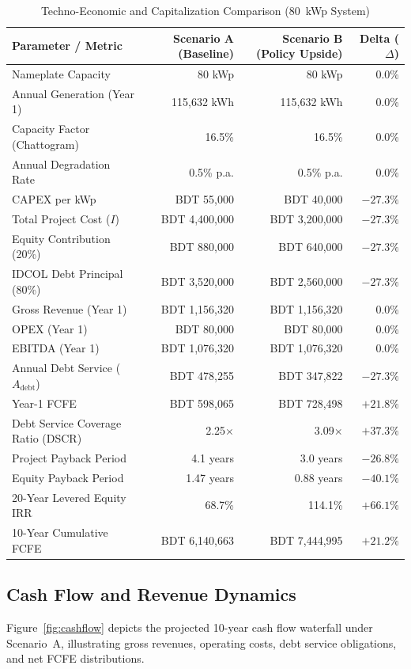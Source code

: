 \documentclass[11pt,a4paper]{article}
\begin{document}
\begin{table}[htbp]
\centering
\footnotesize
\caption{Techno-Economic and Capitalization Comparison (80~kWp System)}
\label{tab:comparison}
\begin{tabular}{@{}l*{3}{r}@{}}
\toprule
\textbf{Parameter / Metric} & \textbf{Scenario A (Baseline)} & \textbf{Scenario B (Policy Upside)} & \textbf{Delta ($\Delta$)} \\
\midrule
Nameplate Capacity & 80 kWp & 80 kWp & 0.0\% \\
Annual Generation (Year 1) & 115,632 kWh & 115,632 kWh & 0.0\% \\
Capacity Factor (Chattogram) & 16.5\% & 16.5\% & 0.0\% \\
Annual Degradation Rate & 0.5\% p.a. & 0.5\% p.a. & 0.0\% \\
\midrule
CAPEX per kWp & BDT 55,000 & BDT 40,000 & $-27.3\%$ \\
Total Project Cost ($I$) & BDT 4,400,000 & BDT 3,200,000 & $-27.3\%$ \\
Equity Contribution (20\%) & BDT 880,000 & BDT 640,000 & $-27.3\%$ \\
IDCOL Debt Principal (80\%) & BDT 3,520,000 & BDT 2,560,000 & $-27.3\%$ \\
\midrule
Gross Revenue (Year 1) & BDT 1,156,320 & BDT 1,156,320 & 0.0\% \\
OPEX (Year 1) & BDT 80,000 & BDT 80,000 & 0.0\% \\
EBITDA (Year 1) & BDT 1,076,320 & BDT 1,076,320 & 0.0\% \\
Annual Debt Service ($A_{\text{debt}}$) & BDT 478,255 & BDT 347,822 & $-27.3\%$ \\
Year-1 FCFE & BDT 598,065 & BDT 728,498 & $+21.8\%$ \\
\midrule
Debt Service Coverage Ratio (DSCR) & 2.25$\times$ & 3.09$\times$ & $+37.3\%$ \\
Project Payback Period & 4.1 years & 3.0 years & $-26.8\%$ \\
Equity Payback Period & 1.47 years & 0.88 years & $-40.1\%$ \\
20-Year Levered Equity IRR & 68.7\% & 114.1\% & $+66.1\%$ \\
10-Year Cumulative FCFE & BDT 6,140,663 & BDT 7,444,995 & $+21.2\%$ \\
\bottomrule
\end{tabular}
\end{table}

\subsection{Cash Flow and Revenue Dynamics}
Figure~\ref{fig:cashflow} depicts the projected 10-year cash flow waterfall under Scenario~A, illustrating gross revenues, operating costs, debt service obligations, and net FCFE distributions.
\end{document}
